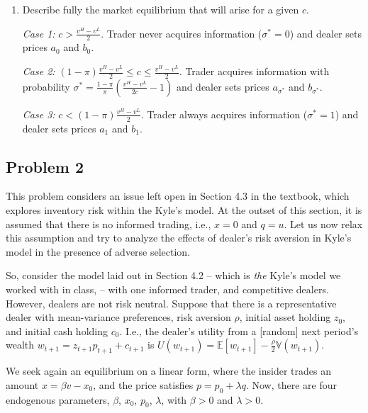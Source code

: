 \documentclass[11pt
, answers
]{exam}
\begin{document}
\begin{enumerate} [label=(\alph*). ]
\begin{solution}
\end{solution}


\item Describe fully the market equilibrium that will arise for a given $c$. 

\begin{solution}
  \textit{Case 1:} $c > \frac{v^H-v^L}{2}$. Trader never acquires information ($\sigma^*=0$) and dealer sets prices $a_0$ and $b_0$. 
  
  \textit{Case 2:} $(1-\pi) \frac{v^H-v^L}{2} \le c \le \frac{v^H-v^L}{2}$. Trader acquires information with probability $\sigma^*=\frac{1-\pi}{\pi} \left(\frac{v^H-v^L}{2c} -1 \right)$ and dealer sets prices $a_{\sigma^*}$ and $b_{\sigma^*}$. 
  
  \textit{Case 3:} $c<(1-\pi) \frac{v^H-v^L}{2}$. Trader always acquires information ($\sigma^*=1$) and dealer sets prices $a_1$ and $b_1$.
\end{solution}

\end{enumerate}



\qquad
\subsection*{Problem 2}


This problem considers an issue left open in Section 4.3 in the textbook, which explores inventory risk within the Kyle's model. At the outset of this section, it is assumed that there is no informed trading, i.e., $x = 0$ and $q = u$. Let us now relax this assumption and try to analyze the effects of dealer's risk aversion in Kyle's model in the presence of adverse selection.

So, consider the model laid out in Section 4.2 -- which is \emph{the} Kyle's model we worked with in class, -- with one informed trader, and competitive dealers. However, dealers are not risk neutral. Suppose that there is a representative dealer with mean-variance preferences, risk aversion $\rho$, initial asset holding $z_{0}$, and initial cash holding $c_{0}$. I.e., the dealer's utility from a [random] next period's wealth $w_{t+1} = z_{t+1}p_{t+1} + c_{t+1}$ is $U(w_{t+1}) = \mathbb{E}[w_{t+1}] - \frac{\rho}{2} \mathbb{V}(w_{t+1})$.

We seek again an equilibrium on a linear form, where the insider trades an amount $x =	\beta v - x_{0}$, and the price satisfies $p = p_{0}+\lambda q$. Now, there are four endogenous parameters, $\beta$, $x_{0}$, $p_{0}$, $\lambda$, with $\beta>0$ and $\lambda>0$.
\end{document}

